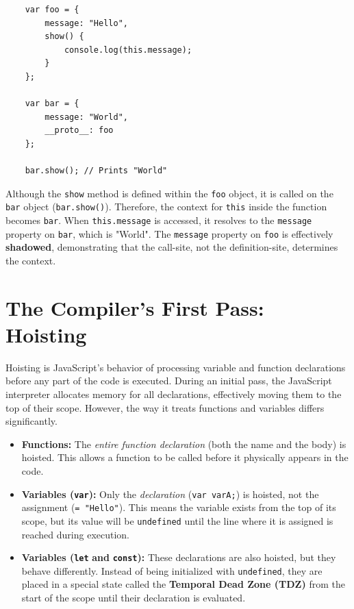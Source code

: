 \documentclass{scrbook}
\begin{document}
\begin{lstlisting}
    var foo = {
        message: "Hello",
        show() {
            console.log(this.message);
        }
    };
    
    var bar = {
        message: "World",
        __proto__: foo
    };
    
    bar.show(); // Prints "World"
\end{lstlisting}

Although the \texttt{show} method is defined within the \texttt{foo} object, it is called on the \texttt{bar} object (\texttt{bar.show()}). Therefore, the context for \texttt{this} inside the function becomes \texttt{bar}. When \texttt{this.message} is accessed, it resolves to the \texttt{message} property on \texttt{bar}, which is "World". The \texttt{message} property on \texttt{foo} is effectively \textbf{shadowed}, demonstrating that the call-site, not the definition-site, determines the context.

\chapter{The Compiler's First Pass: Hoisting}

Hoisting is JavaScript's behavior of processing variable and function declarations before any part of the code is executed. During an initial pass, the JavaScript interpreter allocates memory for all declarations, effectively moving them to the top of their scope. However, the way it treats functions and variables differs significantly.

\begin{itemize}
    \item
    \textbf{Functions:} The \textit{entire function declaration} (both the name and the body) is hoisted. This allows a function to be called before it physically appears in the code.
    
    \item
    \textbf{Variables (}\texttt{\textbf{var}}\textbf{):} Only the \textit{declaration} (\texttt{var varA;}) is hoisted, not the assignment (\texttt{= "Hello"}). This means the variable exists from the top of its scope, but its value will be \texttt{undefined} until the line where it is assigned is reached during execution.

    \item
    \textbf{Variables (}\texttt{\textbf{let}} \textbf{and} \texttt{\textbf{const}}\textbf{):} These declarations are also hoisted, but they behave differently. Instead of being initialized with \texttt{undefined}, they are placed in a special state called the \textbf{Temporal Dead Zone (TDZ)} from the start of the scope until their declaration is evaluated.
\end{itemize}
\end{document}
